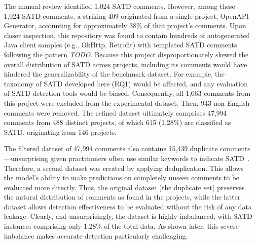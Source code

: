 The manual review identified 1,024 SATD comments. However, among these 1,024 SATD comments, a striking 409 originated from a single project, OpenAPI Generator, accounting for approximately 38\% of that project’s comments. Upon closer inspection, this repository was found to contain hundreds of autogenerated Java client samples (e.g., OkHttp, Retrofit) with templated SATD comments following the pattern \textit{TODO}. Because this project disproportionately skewed the overall distribution of SATD across projects, including its comments would have hindered the generalizability of the benchmark dataset. For example, the taxonomy of SATD developed here (RQ1) would be affected, and any evaluation of SATD detection tools would be biased.
Consequently, all 1,063 comments from this project were excluded from the experimental dataset. Then, 943 non-English comments were removed. The refined dataset ultimately comprises 47,994 comments from 488 distinct projects, of which 615 (1.28\%) are classified as SATD, originating from 146 projects.


% 

The filtered dataset of 47,994 comments also contains 15,439 duplicate comments---unsurprising given practitioners often use similar keywords to indicate SATD~\cite{potdar_exploratory_2014}. Therefore, a second dataset was created by applying deduplication. This allows the model’s ability to make predictions on completely unseen comments to be evaluated more directly. Thus, the original dataset (the duplicate set) preserves the natural distribution of comments as found in the projects, while the latter dataset allows detection effectiveness to be evaluated without the risk of any data leakage. Clearly, and unsurprisingly, the dataset is highly imbalanced, with SATD instances comprising only 1.28\% of the total data. As shown later, this severe imbalance makes accurate detection particularly challenging.

